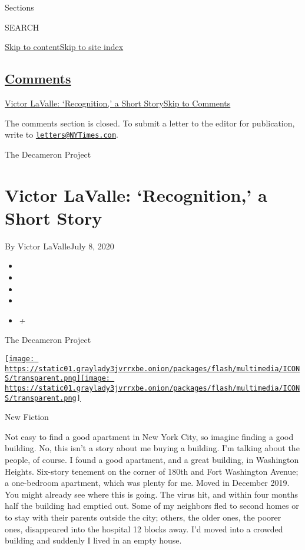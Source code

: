 Sections

SEARCH

\protect\hyperlink{site-content}{Skip to
content}\protect\hyperlink{site-index}{Skip to site index}

\hypertarget{comments}{%
\subsection{\texorpdfstring{\protect\hyperlink{commentsContainer}{Comments}}{Comments}}\label{comments}}

\href{}{Victor LaValle: `Recognition,' a Short Story}\href{}{Skip to
Comments}

The comments section is closed. To submit a letter to the editor for
publication, write to
\href{mailto:letters@NYTimes.com}{\nolinkurl{letters@NYTimes.com}}.

The Decameron Project

\hypertarget{victor-lavalle-recognition-a-short-story}{%
\section{Victor LaValle: `Recognition,' a Short
Story}\label{victor-lavalle-recognition-a-short-story}}

By Victor LaValleJuly 8, 2020

\begin{itemize}
\item
\item
\item
\item
\item
  \emph{+}
\end{itemize}

The Decameron Project

\href{https://www.nytimes3xbfgragh.onion/section/magazine}{\texttt{[image: https://static01.graylady3jvrrxbe.onion/packages/flash/multimedia/ICONS/transparent.png]}\texttt{[image: https://static01.graylady3jvrrxbe.onion/packages/flash/multimedia/ICONS/transparent.png]}}

New Fiction

Not easy to find a good apartment in New York City, so imagine finding a
good building. No, this isn't a story about me buying a building. I'm
talking about the people, of course. I found a good apartment, and a
great building, in Washington Heights. Six-story tenement on the corner
of 180th and Fort Washington Avenue; a one-bedroom apartment, which was
plenty for me. Moved in December 2019. You might already see where this
is going. The virus hit, and within four months half the building had
emptied out. Some of my neighbors fled to second homes or to stay with
their parents outside the city; others, the older ones, the poorer ones,
disappeared into the hospital 12 blocks away. I'd moved into a crowded
building and suddenly I lived in an empty house.

